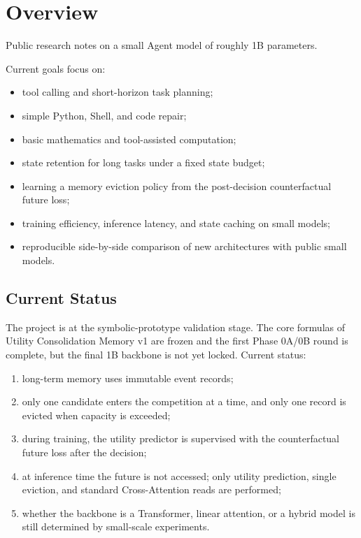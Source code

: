 \section{Overview}

Public research notes on a small Agent model of roughly 1B parameters.

Current goals focus on:

\begin{itemize}
  \item tool calling and short-horizon task planning;
  \item simple Python, Shell, and code repair;
  \item basic mathematics and tool-assisted computation;
  \item state retention for long tasks under a fixed state budget;
  \item learning a memory eviction policy from the post-decision counterfactual future loss;
  \item training efficiency, inference latency, and state caching on small models;
  \item reproducible side-by-side comparison of new architectures with public small models.
\end{itemize}

\subsection{Current Status}

The project is at the symbolic-prototype validation stage. The core formulas of Utility Consolidation Memory v1 are frozen and the first Phase 0A/0B round is complete, but the final 1B backbone is not yet locked. Current status:

\begin{enumerate}
  \item long-term memory uses immutable event records;
  \item only one candidate enters the competition at a time, and only one record is evicted when capacity is exceeded;
  \item during training, the utility predictor is supervised with the counterfactual future loss after the decision;
  \item at inference time the future is not accessed; only utility prediction, single eviction, and standard Cross-Attention reads are performed;
  \item whether the backbone is a Transformer, linear attention, or a hybrid model is still determined by small-scale experiments.
\end{enumerate}

